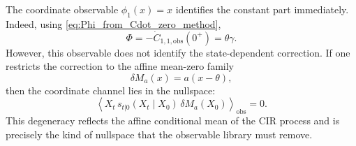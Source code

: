 \documentclass[11pt,twoside,fleqn]{article}
\begin{document}
The coordinate observable \(\phi_1(x)=x\) identifies the constant part immediately. Indeed, using \eqref{eq:Phi_from_Cdot_zero_method},
\begin{equation}
    \Phi
    =
    -\dot C_{1,1,\mathrm{obs}}(0^+)
    =
    \theta\gamma.
    \label{eq:cir_phi_recovery_results}
\end{equation}
However, this observable does not identify the state-dependent correction. If one restricts the correction to the affine mean-zero family
\begin{equation}
    \delta M_a(x)=a(x-\theta),
    \label{eq:cir_affine_correction_family_results}
\end{equation}
then the coordinate channel lies in the nullspace:
\begin{equation}
    \left\langle
        X_t\,s_{t|0}(X_t\mid X_0)\,
        \delta M_a(X_0)
    \right\rangle_{\mathrm{obs}}
    =
    0.
    \label{eq:cir_coordinate_nullspace_results}
\end{equation}
This degeneracy reflects the affine conditional mean of the CIR process and is precisely the kind of nullspace that the observable library must remove.
\end{document}
